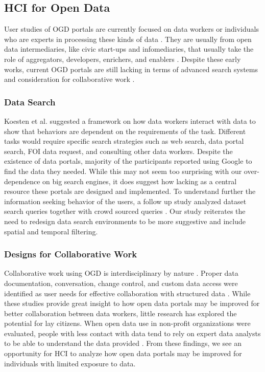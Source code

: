 \documentclass{sigchi}
\begin{document}
\subsection{HCI for Open Data}
User studies of OGD portals are currently focused on data workers or individuals who are experts in processing these kinds of data \cite{Choi2017, Erete2016, kacprzak2019characterising, Koesten2019, Koesten2017}. They are usually from open data intermediaries, like civic start-ups and infomediaries, that usually take the role of aggregators, developers, enrichers, and enablers \cite{VanSchalkwyk2015}. Despite these early works, current OGD portals are still lacking in terms of advanced search systems \cite{kacprzak2019characterising, Koesten2017} and consideration for collaborative work \cite{Choi2017, Erete2016, Koesten2019}.

\subsubsection{Data Search}
Koesten et al. \cite{Koesten2017} suggested a framework on how data workers interact with data to show that behaviors are dependent on the requirements of the task. Different tasks would require specific search strategies such as web search, data portal search, FOI data request, and consulting other data workers. Despite the existence of data portals, majority of the participants reported using Google to find the data they needed. While this may not seem too surprising with our over-dependence on big search engines, it does suggest how lacking as a central resource these portals are designed and implemented. To understand further the information seeking behavior of the users, a follow up study analyzed dataset search queries together with crowd sourced queries \cite{kacprzak2019characterising}. Our study reiterates the need to redesign data search environments to be more suggestive and include spatial and temporal filtering.

\subsubsection{Designs for Collaborative Work}
Collaborative work using OGD is interdisciplinary by nature \cite{Choi2017}. Proper data documentation, conversation, change control, and custom data access were identified as user needs for effective collaboration with structured data \cite{Koesten2019}. While these studies provide great insight to how open data portals may be improved for better collaboration between data workers, little research has explored the potential for lay citizens. When open data use in non-profit organizations were evaluated, people with less contact with data tend to rely on expert data analysts to be able to understand the data provided \cite{Erete2016}. From these findings, we see an opportunity for HCI to analyze how open data portals may be improved for individuals with limited exposure to data.
\end{document}
